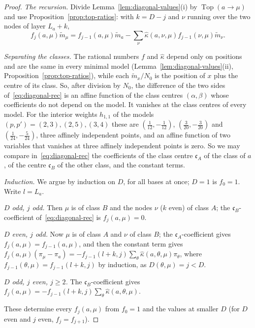 \documentclass[twoside,10pt]{article}
\numberwithin{equation}{section}
\theoremstyle{slbody}
\theoremstyle{definition}
\theoremstyle{remark}
\begin{document}
\begin{proof}
\emph{The recursion.}  Divide Lemma~\ref{lem:diagonal-values}(i) by
$\operatorname{Top}(a\to\mu)$ and use Proposition~\ref{prop:top-ratios}: with
$k=D-j$ and $\nu$ running over the two nodes of layer $L_a+k$,
\begin{equation}\label{eq:diagonal-rec}
 f_j(a,\mu)\tilde m_\mu=f_{j-1}(a,\mu)\tilde m_a
 -\sum_\nu\hat\kappa(a,\nu,\mu)f_{j-1}(\nu,\mu)\tilde m_\nu .
\end{equation}

\emph{Separating the classes.}  The rational numbers $f$ and $\hat\kappa$
depend only on positions and are the same in every minimal model
(Lemma~\ref{lem:diagonal-values}(ii), Proposition~\ref{prop:top-ratios}),
while each $\tilde m_x/N_0$ is the position of $x$ plus the centre of its
class.  So, after division by $N_0$, the difference of the two sides
of~\eqref{eq:diagonal-rec} is an affine function of the class centres
$(\alpha,\beta)$ whose coefficients do not depend on the model.  It vanishes
at the class centres of every model.  For the interior weights $h_{1,1}$ of
the models $(p,p')=(2,3),(2,5),(3,4)$ these are $(\frac1{12},-\frac1{12})$,
$(\frac3{20},-\frac3{20})$ and $(\frac1{24},-\frac5{24})$, three affinely
independent points, and an affine function of two variables that vanishes at
three affinely independent points is zero.  So we may compare
in~\eqref{eq:diagonal-rec} the coefficients of the class centre $\mathfrak c_A$ of the
class of $a$, of the centre $\mathfrak c_B$ of the other class, and the constant terms.

\emph{Induction.}  We argue by induction on $D$, for all bases at once; $D=1$
is $f_0=1$.  Write $l=L_a$.

\emph{$D$ odd, $j$ odd.}  Then $\mu$ is of class $B$ and the nodes $\nu$ ($k$
even) of class $A$; the $\mathfrak c_B$-coefficient of~\eqref{eq:diagonal-rec} is
$f_j(a,\mu)=0$.

\emph{$D$ even, $j$ odd.}  Now $\mu$ is of class $A$ and $\nu$ of class $B$;
the $\mathfrak c_A$-coefficient gives $f_j(a,\mu)=f_{j-1}(a,\mu)$, and then the constant
term gives
$f_j(a,\mu)(\pi_\mu-\pi_a)=-f_{j-1}(l+k,j)\sum_\theta\hat\kappa(a,\theta,\mu)\pi_\theta$,
where $f_{j-1}(\theta,\mu)=f_{j-1}(l+k,j)$ by induction, as $D(\theta,\mu)=j<D$.

\emph{$D$ odd, $j$ even, $j\geq2$.}  The $\mathfrak c_B$-coefficient gives
$f_j(a,\mu)=-f_{j-1}(l+k,j)\sum_\theta\hat\kappa(a,\theta,\mu)$.

These determine every $f_j(a,\mu)$ from $f_0=1$ and the values at smaller $D$
(for $D$ even and $j$ even, $f_j=f_{j+1}$).


\end{proof}
\end{document}
